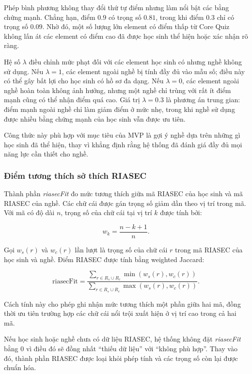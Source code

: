 Phép bình phương không thay đổi thứ tự điểm nhưng làm nổi bật các bằng chứng mạnh. Chẳng hạn, điểm $0.9$ có trọng số $0.81$, trong khi điểm $0.3$ chỉ có trọng số $0.09$. Nhờ đó, một số lượng lớn element có điểm thấp từ Core Quiz không lấn át các element có điểm cao đã được học sinh thể hiện hoặc xác nhận rõ ràng.

Hệ số $\lambda$ điều chỉnh mức phạt đối với các element học sinh có nhưng nghề không sử dụng. Nếu $\lambda=1$, các element ngoài nghề bị tính đầy đủ vào mẫu số; điều này có thể gây bất lợi cho học sinh có hồ sơ đa dạng. Nếu $\lambda=0$, các element ngoài nghề hoàn toàn không ảnh hưởng, nhưng một nghề chỉ trùng với rất ít điểm mạnh cũng có thể nhận điểm quá cao. Giá trị $\lambda=0.3$ là phương án trung gian: điểm mạnh ngoài nghề chỉ làm giảm điểm ở mức nhẹ, trong khi nghề sử dụng được nhiều bằng chứng mạnh của học sinh vẫn được ưu tiên.

Công thức này phù hợp với mục tiêu của MVP là gợi ý nghề dựa trên những gì học sinh đã thể hiện, thay vì khẳng định rằng hệ thống đã đánh giá đầy đủ mọi năng lực cần thiết cho nghề.

\subsubsection{Điểm tương thích sở thích RIASEC}

Thành phần \textit{riasecFit} đo mức tương thích giữa mã RIASEC của học sinh và mã RIASEC của nghề. Các chữ cái được gán trọng số giảm dần theo vị trí trong mã. Với mã có độ dài $n$, trọng số của chữ cái tại vị trí $k$ được tính bởi:

\begin{equation}
	w_k=\frac{n-k+1}{n}.
\end{equation}

Gọi $w_s(r)$ và $w_c(r)$ lần lượt là trọng số của chữ cái $r$ trong mã RIASEC của học sinh và nghề. Điểm RIASEC được tính bằng weighted Jaccard:

\begin{equation}
	\text{riasecFit}
	=
	\frac{
		\sum\limits_{r \in R_s \cup R_c}
		\min\left(w_s(r),w_c(r)\right)
	}{
		\sum\limits_{r \in R_s \cup R_c}
		\max\left(w_s(r),w_c(r)\right)
	}.
\end{equation}

Cách tính này cho phép ghi nhận mức tương thích một phần giữa hai mã, đồng thời ưu tiên trường hợp các chữ cái nổi trội xuất hiện ở vị trí cao trong cả hai mã.

Nếu học sinh hoặc nghề chưa có dữ liệu RIASEC, hệ thống không đặt \textit{riasecFit} bằng 0 vì điều đó sẽ đồng nhất ``thiếu dữ liệu'' với ``không phù hợp''. Thay vào đó, thành phần RIASEC được loại khỏi phép tính và các trọng số còn lại được chuẩn hóa.

